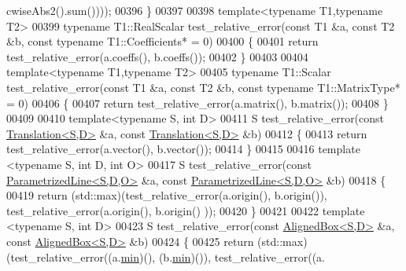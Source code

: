 \begin{DoxyCode}
      cwiseAbs2().sum())));
00396 \}
00397 
00398 \textcolor{keyword}{template}<\textcolor{keyword}{typename} T1,\textcolor{keyword}{typename} T2>
00399 \textcolor{keyword}{typename} T1::RealScalar test\_relative\_error(\textcolor{keyword}{const} T1 &a, \textcolor{keyword}{const} T2 &b, \textcolor{keyword}{const} \textcolor{keyword}{typename} T1::Coefficients* = 0)
00400 \{
00401   \textcolor{keywordflow}{return} test\_relative\_error(a.coeffs(), b.coeffs());
00402 \}
00403 
00404 \textcolor{keyword}{template}<\textcolor{keyword}{typename} T1,\textcolor{keyword}{typename} T2>
00405 \textcolor{keyword}{typename} T1::Scalar test\_relative\_error(\textcolor{keyword}{const} T1 &a, \textcolor{keyword}{const} T2 &b, \textcolor{keyword}{const} \textcolor{keyword}{typename} T1::MatrixType* = 0)
00406 \{
00407   \textcolor{keywordflow}{return} test\_relative\_error(a.matrix(), b.matrix());
00408 \}
00409 
00410 \textcolor{keyword}{template}<\textcolor{keyword}{typename} S, \textcolor{keywordtype}{int} D>
00411 S test\_relative\_error(\textcolor{keyword}{const} \hyperlink{group___geometry___module_class_eigen_1_1_translation}{Translation<S,D>} &a, \textcolor{keyword}{const} 
      \hyperlink{group___geometry___module_class_eigen_1_1_translation}{Translation<S,D>} &b)
00412 \{
00413   \textcolor{keywordflow}{return} test\_relative\_error(a.vector(), b.vector());
00414 \}
00415 
00416 \textcolor{keyword}{template} <\textcolor{keyword}{typename} S, \textcolor{keywordtype}{int} D, \textcolor{keywordtype}{int} O>
00417 S test\_relative\_error(\textcolor{keyword}{const} \hyperlink{group___geometry___module_class_eigen_1_1_parametrized_line}{ParametrizedLine<S,D,O>} &a, \textcolor{keyword}{const} 
      \hyperlink{group___geometry___module_class_eigen_1_1_parametrized_line}{ParametrizedLine<S,D,O>} &b)
00418 \{
00419   \textcolor{keywordflow}{return} (std::max)(test\_relative\_error(a.origin(), b.origin()), test\_relative\_error(a.origin(), b.origin()
      ));
00420 \}
00421 
00422 \textcolor{keyword}{template} <\textcolor{keyword}{typename} S, \textcolor{keywordtype}{int} D>
00423 S test\_relative\_error(\textcolor{keyword}{const} \hyperlink{group___geometry___module_class_eigen_1_1_aligned_box}{AlignedBox<S,D>} &a, \textcolor{keyword}{const} 
      \hyperlink{group___geometry___module_class_eigen_1_1_aligned_box}{AlignedBox<S,D>} &b)
00424 \{
00425   \textcolor{keywordflow}{return} (std::max)(test\_relative\_error((a.\hyperlink{group___geometry___module_a4b23dedc65215a939c1794f83017c58d}{min})(), (b.\hyperlink{group___geometry___module_a4b23dedc65215a939c1794f83017c58d}{min})()), test\_relative\_error((a.

\end{DoxyCode}
